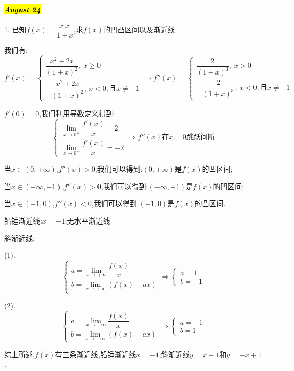 \hl{\textbf{\textit{August 24}}}

1. 已知$f(x)=\dfrac{x|x|}{1+x}$,求$f(x)$的凹凸区间以及渐近线
\begin{solution}

	我们有:  
	$$f'(x)=\left\lbrace
	\begin{array}{l}
		\dfrac{x^2+2x}{(1+x)^2},\ x\geq 0\\
		-\dfrac{x^2+2x}{(1+x)^2},\ x<0,\text{且}x\neq -1
	\end{array}
	\right. \Rightarrow f''(x)=\left\lbrace
	\begin{array}{l}
		\dfrac{2}{(1+x)^3},\ x>0\\
		-\dfrac{2}{(1+x)^3},\ x<0,\text{且}x\neq -1
	\end{array}
	\right. $$
	
	$f'(0)=0$,我们利用导数定义得到:  
	$$\left\lbrace
	\begin{array}{l}
		\lim\limits_{x\rightarrow 0^{+}}\dfrac{f'(x)}{x}=2\\
		\lim\limits_{x\rightarrow 0^{-}}\dfrac{f'(x)}{x}=-2
	\end{array}
	\right. \Rightarrow f''(x)\text{在}x=0\text{跳跃间断}$$
	
	当$x\in(0,+\infty)$,$f''(x)>0$,我们可以得到:$(0,+\infty)$是$f(x)$的凹区间;
	
	当$x\in(-\infty,-1)$,$f''(x)>0$,我们可以得到:$(-\infty,-1)$是$f(x)$的凹区间;
	
	当$x\in(-1,0)$,$f''(x)<0$,我们可以得到:$(-1,0)$是$f(x)$的凸区间.
	
	铅锤渐近线:$x=-1$;无水平渐近线
	
	斜渐近线:  
	
	(1).
	$$\left\lbrace
	\begin{array}{l}
		a=\lim\limits_{x\rightarrow+\infty}\dfrac{f(x)}{x}\\
		b=\lim\limits_{x\rightarrow+\infty}(f(x)-ax)
	\end{array}
	\right. \Rightarrow\left\lbrace
	\begin{array}{l}
		a=1\\
		b=-1
	\end{array}
	\right. $$
	
	(2).
	$$\left\lbrace
	\begin{array}{l}
		a=\lim\limits_{x\rightarrow-\infty}\dfrac{f(x)}{x}\\
		b=\lim\limits_{x\rightarrow-\infty}(f(x)-ax)
	\end{array}
	\right. \Rightarrow\left\lbrace
	\begin{array}{l}
		a=-1\\
		b=1
	\end{array}
	\right. $$
	
	综上所述,$f(x)$有三条渐近线,铅锤渐近线$x=-1$;斜渐近线$y=x-1$和$y=-x+1$.
\end{solution}

